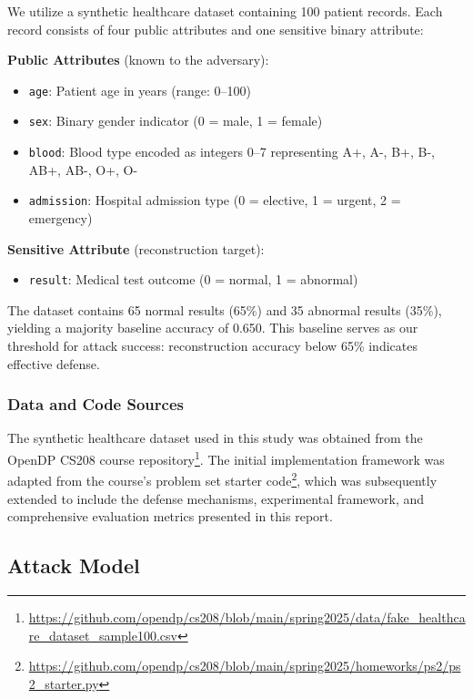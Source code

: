 \documentclass[11pt,letterpaper]{article}
\begin{document}
We utilize a synthetic healthcare dataset containing 100 patient records. Each record consists of four public attributes and one sensitive binary attribute:

\textbf{Public Attributes} (known to the adversary):
\begin{itemize}[leftmargin=*]
    \item \texttt{age}: Patient age in years (range: 0--100)
    \item \texttt{sex}: Binary gender indicator (0 = male, 1 = female)
    \item \texttt{blood}: Blood type encoded as integers 0--7 representing A+, A-, B+, B-, AB+, AB-, O+, O-
    \item \texttt{admission}: Hospital admission type (0 = elective, 1 = urgent, 2 = emergency)
\end{itemize}

\textbf{Sensitive Attribute} (reconstruction target):
\begin{itemize}[leftmargin=*]
    \item \texttt{result}: Medical test outcome (0 = normal, 1 = abnormal)
\end{itemize}

The dataset contains 65 normal results (65\%) and 35 abnormal results (35\%), yielding a majority baseline accuracy of 0.650. This baseline serves as our threshold for attack success: reconstruction accuracy below 65\% indicates effective defense.

\subsubsection{Data and Code Sources}

The synthetic healthcare dataset used in this study was obtained from the OpenDP CS208 course repository\footnote{\url{https://github.com/opendp/cs208/blob/main/spring2025/data/fake_healthcare_dataset_sample100.csv}}. The initial implementation framework was adapted from the course's problem set starter code\footnote{\url{https://github.com/opendp/cs208/blob/main/spring2025/homeworks/ps2/ps2_starter.py}}, which was subsequently extended to include the defense mechanisms, experimental framework, and comprehensive evaluation metrics presented in this report.

\subsection{Attack Model}
\end{document}
